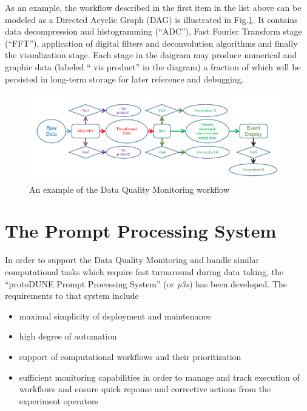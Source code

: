 \documentclass{PoS}
\newcommand{\pd}{protoDUNE\xspace}
\begin{document}
\noindent As an example, the workflow described in the first item in the list above can be modeled as a Directed Acyclic Graph (DAG)
is illustrated in Fig.\ref{fig:dag1}. It contains data decompression and histogramming (``ADC''), Fast Fourier Transform stage (``FFT''),
application of digital filters and deconvolution algorithms and finally the visualization stage. Each stage in the daigram may produce
numerical and graphic data (labeled `` vis product'' in the diagram) a fraction of which will be persisted in long-term storage for
later reference and debugging.

\begin{figure}[tb]
\centering\includegraphics[width=1.0\textwidth]{dag1.pdf}
\caption{\label{fig:dag1}An example of the Data Quality Monitoring workflow}
\end{figure}

\section{The Prompt Processing System}
In order to support the Data Quality Monitoring and handle similar computational tasks which require fast turnaround during data taking,
the ``\pd Prompt Processing System'' (or \textit{p3s}) has been developed. The requirements to that system include
\begin{itemize}
\item maximal simplicity of deployment and maintenance

\item high degree of automation

\item support of computational workflows and their prioritization

\item sufficient monitoring capabilities in order to manage and track execution of workflows and ensure quick
reponse and corrective actions from the experiment operators
\end{itemize}
\end{document}
